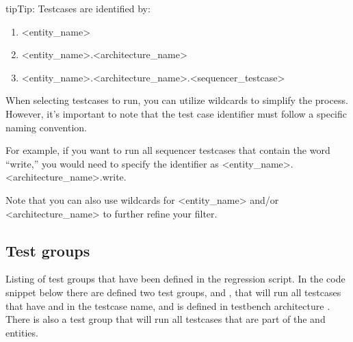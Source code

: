 \documentclass[letterpaper,10pt,english]{sphinxmanual}
\begin{document}
\begin{sphinxadmonition}{tip}{Tip:}
\sphinxAtStartPar
Testcases are identified by:
\begin{enumerate}
%
\item {} 
\sphinxAtStartPar
\textless{}entity\_name\textgreater{}

\item {} 
\sphinxAtStartPar
\textless{}entity\_name\textgreater{}.\textless{}architecture\_name\textgreater{}

\item {} 
\sphinxAtStartPar
\textless{}entity\_name\textgreater{}.\textless{}architecture\_name\textgreater{}.\textless{}sequencer\_testcase\textgreater{}

\end{enumerate}

\begin{DUlineblock}{0em}
\item[] When selecting testcases to run, you can utilize wildcards to simplify the process. However, it’s important to
note that the test case identifier must follow a specific naming convention.
\item[] For example, if you want to run all sequencer testcases that contain the word “write,” you would need to specify
the identifier as \textless{}entity\_name\textgreater{}.\textless{}architecture\_name\textgreater{}.write.
\item[] Note that you can also use wildcards for \textless{}entity\_name\textgreater{} and/or \textless{}architecture\_name\textgreater{} to further
refine your filter.
\end{DUlineblock}
\end{sphinxadmonition}


\subsection{Test groups}
\label{\detokenize{cli:test-groups}}
\sphinxAtStartPar
Listing of test groups that have been defined in the regression script. In the code snippet below there are defined
two test groups,  and , that will run all testcases that have  and 
in the testcase name, and is defined in testbench  architecture .
There is also a test group  that will run all testcases that are part of the  and
 entities.
\end{document}
